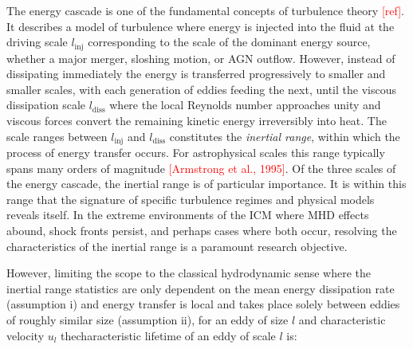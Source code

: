 The energy cascade is one of the fundamental concepts of turbulence theory \textcolor{red}{[ref]}. It describes a model of turbulence where energy is injected into the fluid at the driving scale $l_\mathrm{inj}$ corresponding to the scale of the dominant energy source, whether a major merger, sloshing motion, or AGN outflow. However, instead of dissipating immediately the energy is transferred progressively to smaller and smaller scales, with each generation of eddies feeding the next, until the viscous dissipation scale $l_\mathrm{diss}$ where the local Reynolds number approaches unity and viscous forces convert the remaining kinetic energy irreversibly into heat. The scale ranges between $l_\mathrm{inj}$ and $l_\mathrm{diss}$ constitutes the \textit{inertial range}, within which the process of energy transfer occurs. For astrophysical scales this range typically spans many orders of magnitude \textcolor{red}{[Armstrong et al., 1995]}. 
\pbreak
Of the three scales of the energy cascade, the inertial range is of particular importance. It is within this range that the signature of specific turbulence regimes and physical models reveals itself. In the extreme environments of the ICM where MHD effects abound, shock fronts persist, and perhaps cases where both occur, resolving the characteristics of the inertial range is a paramount research objective.

\noindent However, limiting the scope to the classical hydrodynamic sense where the inertial range statistics are only dependent on the mean energy dissipation rate (assumption i) and energy transfer is local and takes place solely between eddies of roughly similar size (assumption ii), for an eddy of size $l$ and characteristic velocity $u_{l}$ thecharacteristic lifetime of an eddy of scale $l$ is:

